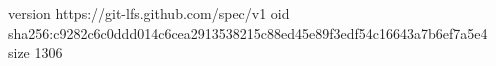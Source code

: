 version https://git-lfs.github.com/spec/v1
oid sha256:c9282c6c0ddd014c6cea2913538215c88ed45e89f3edf54c16643a7b6ef7a5e4
size 1306
